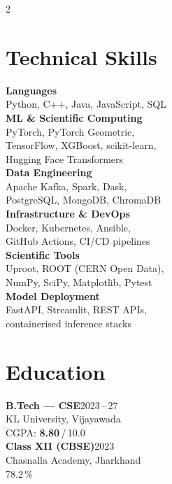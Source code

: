 \documentclass[10pt,a4paper]{extarticle}
\begin{document}
\begin{paracol}{2}

\begin{leftcolumn}
\raggedright

\section*{Technical Skills}
{\small
\textbf{Languages}\\
Python, C++, Java, JavaScript, SQL\\[3pt]
\textbf{ML \& Scientific Computing}\\
PyTorch, PyTorch Geometric,\\
TensorFlow, XGBoost, scikit-learn,\\
Hugging Face Transformers\\[3pt]
\textbf{Data Engineering}\\
Apache Kafka, Spark, Dask,\\
PostgreSQL, MongoDB, ChromaDB\\[3pt]
\textbf{Infrastructure \& DevOps}\\
Docker, Kubernetes, Ansible,\\
GitHub Actions, CI/CD pipelines\\[3pt]
\textbf{Scientific Tools}\\
Uproot, ROOT (CERN Open Data),\\
NumPy, SciPy, Matplotlib, Pytest\\[3pt]
\textbf{Model Deployment}\\
FastAPI, Streamlit, REST APIs,\\
containerised inference stacks
}

\section*{Education}
{\small
\textbf{B.Tech --- CSE}\hfill 2023\,--\,27\\
KL University, Vijayawada\\
CGPA: \textbf{8.80}\,/\,10.0\\[4pt]
\textbf{Class XII (CBSE)}\hfill 2023\\
Chasnalla Academy, Jharkhand\\
78.2\,\%
}


\end{leftcolumn}
\end{paracol}
\end{document}
